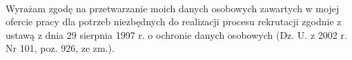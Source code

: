 \leavevmode
\\Wyrażam zgodę na przetwarzanie moich danych osobowych zawartych w mojej ofercie pracy dla potrzeb niezbędnych do realizacji procesu rekrutacji zgodnie z ustawą z dnia 29 sierpnia 1997 r. o ochronie danych osobowych (Dz. U. z 2002 r. Nr 101, poz. 926, ze zm.).